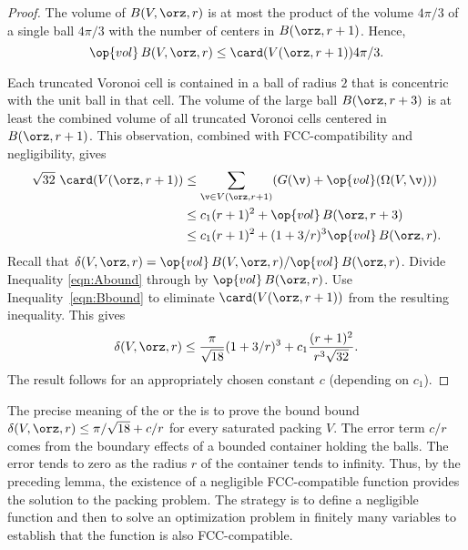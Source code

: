 \begin{proof} 
The volume of $B( V,\orz,r)$ is at most the product of the volume
$4\pi/3$ of a single ball $4\pi/3$ with the number of centers in
$B(\orz,r+1)$.  Hence,
\begin{equation} 
\op{vol}\, B( V,\orz,r) \le \card( V(\orz,r+1)) 4\pi/3.
\label{eqn:Abound}
\end{equation}

Each truncated Voronoi cell is contained in a ball of
radius $2$ that is concentric with the unit ball in that cell.  The volume
of the large ball $B(\orz,r+3)$ is at least the combined volume of 
all truncated Voronoi
cells centered in $B(\orz,r+1)$. This observation,
combined with FCC-compatibility and negligibility, gives
\begin{equation} 
\begin{split} 
\sqrt{32}\,\,\card( V(\orz,r+1))
&\le \sum_{\v\in V(\orz,r+1)} (G(\v) +
\op{vol}(\Omega(V,\v))) \\
&\le c_1 (r+1)^2 + \op{vol}\,B(\orz,r+3) \\
&\le c_1 (r+1)^2 + (1+3/r)^3 \op{vol}\,B(\orz,r).
\label{eqn:Bbound}
\end{split}
\end{equation}
%
Recall that $\delta( V,\orz,r)=
\op{vol}\,B( V,\orz,r)/\op{vol}\,B(\orz,r)$. Divide Inequality
\ref{eqn:Abound} through by $\op{vol}\,B(\orz,r)$.  Use
Inequality~\ref{eqn:Bbound} to eliminate $\card( V(\orz,r+1))$ from the
resulting inequality.  This gives
\[ \delta( V,\orz,r)
\le \frac{\pi}{\sqrt{18}} (1+3/r)^3 + c_1 \frac{(r+1)^2}{r^3\sqrt{32}}.
\] 
The result follows for an appropriately chosen constant $c$
(depending on $c_1$).
\end{proof}

\begin{remark}
\label{remark:precise} 
The precise meaning of the  or the
 is to prove the bound bound $\delta(
V,\orz,r) \le \pi/\sqrt{18} + c/r$ for every saturated packing $ V$.
The error term $c/r$ comes from the boundary effects of a bounded
container holding the balls.  The error tends to zero as the radius
$r$ of the container tends to infinity.  Thus, by the preceding lemma,
the existence of a negligible FCC-compatible function provides the
solution to the packing problem.  The strategy is to define a
negligible function and then to solve an optimization problem in
finitely many variables to establish that the function is also
FCC-compatible.
\end{remark}





